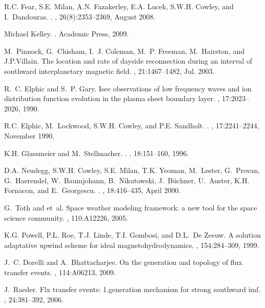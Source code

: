 \begin{thebibliography}{10}
	R.C. Fear, S.E. Milan, A.N. Fazakerley, E.A. Lucek, S.W.H. Cowley, and
	I.~Dandouras.
	\newblock {}.
	, 26(8):2353--2369, August 2008.
	
	Michael Kelley.
	.
	\newblock Academic Press, 2009.
	
	M.~Pinnock, G.~Chisham, I.~J. Coleman, M.~P. Freeman, M.~Hairston, and
	J.P.Villain.
	\newblock The location and rate of dayside reconnection during an interval of
	southward interplanetary magnetic field.
	, 21:1467--1482, Jul. 2003.
	
	R.~C. Elphic and S.~P. Gary.
	\newblock Isee observations of low frequency waves and ion distribution
	function evolution in the plasma sheet boundary layer.
	, 17:2023--2026, 1990.
	
	R.C. Elphic, M.~Lockwood, S.W.H. Cowley, and P.E. Sandholt.
	\newblock {}.
	, 17:2241--2244, November 1990.
	
	K.H. Glassmeier and M.~Stellmacher.
	\newblock {}.
	, 18:151--160, 1996.
	
	D.A. Neudegg, S.W.H. Cowley, S.E. Milan, T.K. Yeoman, M.~Lester, G.~Provan,
	G.~Haerendel, W.~Baumjohann, B.~Nikutowski, J.~B{\"u}chner, U.~Auster, K.H.
	Fornacon, and E.~Georgescu.
	\newblock {}.
	, 18:416--435, April 2000.
	
	G.~Toth and et~al.
	\newblock Space weather modeling framework: a new tool for the space science
	community.
	, 110:A12226, 2005.
	
	K.G. Powell, P.L. Roe, T.J. Linde, T.I. Gombosi, and D.L.~De Zeeuw.
	\newblock A solution adaptative upwind scheme for ideal magnetohydrodynamics.
	, 154:284--309, 1999.
	
	J.~C. Dorelli and A.~Bhattacharjee.
	\newblock On the generation and topology of flux transfer events.
	, 114:A06213, 2009.
	
	J.~Raeder.
	\newblock Flx transfer events: 1.generation mechanism for strong southward imf.
	, 24:381--392, 2006.
	
\end{thebibliography}
